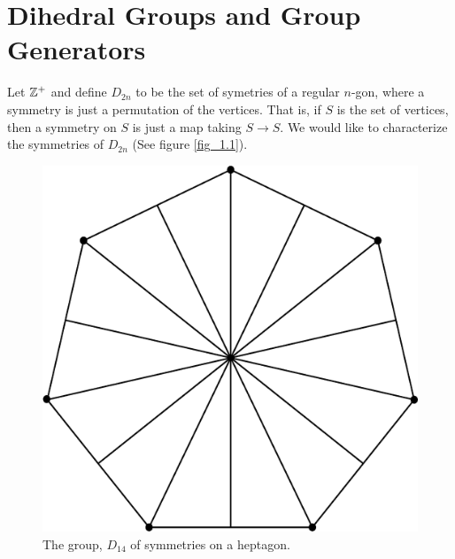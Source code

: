 \section{Dihedral Groups and Group Generators}
\label{section_1.2}

Let $\mathbb{Z}^+$ and define $D_{2n}$ to be the set of symetries of a regular $n$-gon,
where a symmetry is just a permutation of the vertices. That is, if  $S$ is the
set of vertices, then a symmetry on  $S$ is just a map taking $S \rightarrow S$.
We would like to characterize the symmetries of $D_{2n}$ (See figure
\ref{fig_1.1}).

\begin{figure}
  \centering
  \includegraphics[scale=0.2]{parts/group_theory/figures/Chapter1/D_14_symm.eps}
  \caption{The group, $D_{14}$ of symmetries on a heptagon.}
  \label{figure_1.1}
\end{figure}


